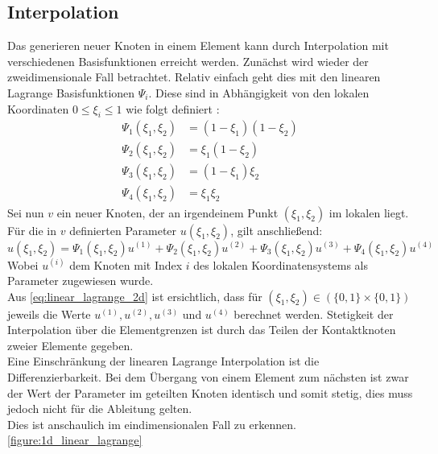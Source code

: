 \documentclass[
	a4paper,			%
	11pt,				%
	headsepline,		%
	bibtotoc,			%
	BCOR18mm,      		%
	DIV14,				%
	headings=normal,
	numbers=noenddot,
]{scrbook}
\theoremstyle{mythmstyle}
\theoremstyle{other}
\begin{document}
	 	\subsection{Interpolation}\label{subsec:interpolation}
	 	Das generieren neuer Knoten in einem Element kann durch Interpolation
	 	mit verschiedenen Basisfunktionen erreicht werden. Zunächst wird wieder der 
	 	zweidimensionale Fall betrachtet. Relativ einfach geht dies mit den
	 	linearen Lagrange Basisfunktionen $\Psi_i$. Diese sind in Abhängigkeit
	 	von den lokalen Koordinaten $0 \leq \xi_i \leq 1$ wie folgt definiert
	 	\cite[S.~52]{modelling}:
	 	\begin{equation}
	 	\label{eq:linear_lagrange_2d}
	 	\begin{split}
	 	\Psi_1 (\xi_1,\xi_2) &= (1-\xi_1)(1-\xi_2)\\
	 	\Psi_2 (\xi_1,\xi_2) &= \xi_1(1-\xi_2)\\
	 	\Psi_3 (\xi_1,\xi_2) &= (1-\xi_1)\xi_2\\
	 	\Psi_4 (\xi_1,\xi_2) &= \xi_1\xi_2
	 	\end{split}
	 	\end{equation}
	 	Sei nun $v$ ein neuer Knoten, der an irgendeinem Punkt $(\xi_1,\xi_2)$ im
	 	lokalen liegt. Für die in $v$ definierten Parameter $u(\xi_1,\xi_2)$, gilt
	 	anschließend:
	 	\begin{equation}
	 	\label{eq:nodal_parameter_linear_lagrange}
	 	u(\xi_1,\xi_2) = \Psi_1 (\xi_1,\xi_2)u^{(1)} + \Psi_2 (\xi_1,\xi_2)u^{(2)}
	 	+ \Psi_3 (\xi_1,\xi_2)u^{(3)} + \Psi_4 (\xi_1,\xi_2)u^{(4)}
	 	\end{equation}
	 	Wobei $u^{(i)}$ dem Knoten mit Index $i$ des lokalen Koordinatensystems
	 	als Parameter zugewiesen wurde.\\
	 	Aus \autoref{eq:linear_lagrange_2d} ist ersichtlich, dass für 
	 	$(\xi_1,\xi_2) \in (\{0,1\} \times \{0,1\})$ jeweils die Werte 
	 	$u^{(1)}, u^{(2)}, u^{(3)}$ und $u^{(4)}$ berechnet werden. Stetigkeit
	 	der Interpolation über die Elementgrenzen ist durch das Teilen der 
	 	Kontaktknoten zweier Elemente gegeben.\\
	 	Eine Einschränkung der linearen Lagrange Interpolation ist die 
	 	Differenzierbarkeit. Bei dem Übergang von einem Element zum nächsten
	 	ist zwar der Wert der Parameter im geteilten Knoten identisch und
	 	somit stetig, dies muss jedoch nicht für die Ableitung gelten.\\
	 	Dies ist anschaulich im eindimensionalen Fall zu erkennen. 
	 	\autoref{figure:1d_linear_lagrange}		
\end{document}
